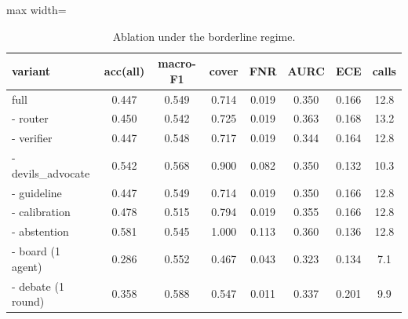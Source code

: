 \documentclass[12pt]{article}
\begin{document}
\begin{table}[htbp]
\centering
\small
\renewcommand{\arraystretch}{1.25}
\setlength{\tabcolsep}{5pt}
\begin{adjustbox}{max width=\linewidth}
\begin{tabular}{|l|c|c|c|c|c|c|c|}
\hline
\rowcolor{tblhead}
\textbf{variant} & \textbf{acc(all)} & \textbf{macro-F1} & \textbf{cover} & \textbf{FNR} & \textbf{AURC} & \textbf{ECE} & \textbf{calls} \\ \hline
full & 0.447 & 0.549 & 0.714 & 0.019 & 0.350 & 0.166 & 12.8 \\
\hline
- router & 0.450 & 0.542 & 0.725 & 0.019 & 0.363 & 0.168 & 13.2 \\
\hline
- verifier & 0.447 & 0.548 & 0.717 & 0.019 & 0.344 & 0.164 & 12.8 \\
\hline
- devils\_advocate & 0.542 & 0.568 & 0.900 & 0.082 & 0.350 & 0.132 & 10.3 \\
\hline
- guideline & 0.447 & 0.549 & 0.714 & 0.019 & 0.350 & 0.166 & 12.8 \\
\hline
- calibration & 0.478 & 0.515 & 0.794 & 0.019 & 0.355 & 0.166 & 12.8 \\
\hline
- abstention & 0.581 & 0.545 & 1.000 & 0.113 & 0.360 & 0.136 & 12.8 \\
\hline
- board (1 agent) & 0.286 & 0.552 & 0.467 & 0.043 & 0.323 & 0.134 & 7.1 \\
\hline
- debate (1 round) & 0.358 & 0.588 & 0.547 & 0.011 & 0.337 & 0.201 & 9.9 \\
\hline
\end{tabular}
\end{adjustbox}
\caption{Ablation under the borderline regime.}
\label{tab:abl-borderline}
\end{table}
\end{document}
